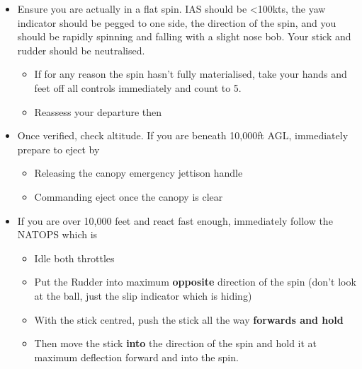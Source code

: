 \begin{itemize}

  \item Ensure you are actually in a flat spin. IAS should be <100kts, the yaw
    indicator should be pegged to one side, the direction of the spin, and you
    should be rapidly spinning and falling with a slight nose bob. Your stick
    and rudder should be neutralised.

  \begin{itemize}

    \item If for any reason the spin hasn't fully materialised, take your hands
      and feet off all controls immediately and count to 5.

    \item Reassess your departure then

  \end{itemize}

  \item Once verified, check altitude. If you are beneath 10,000ft AGL,
    immediately prepare to eject by

  \begin{itemize}
    \item Releasing the canopy emergency jettison handle
    \item Commanding eject once the canopy is clear
  \end{itemize}

  \item If you are over 10,000 feet and react fast enough, immediately follow
    the NATOPS which is

  \begin{itemize}

    \item Idle both throttles

    \item Put the Rudder into maximum \textbf{opposite} direction of the spin
      (don't look at the ball, just the slip indicator which is hiding)

    \item With the stick centred, push the stick all the way \textbf{forwards
      and hold}

    \item Then move the stick \textbf{into} the direction of the spin and hold
      it at maximum deflection forward and into the spin.

  \end{itemize}


\end{itemize}
